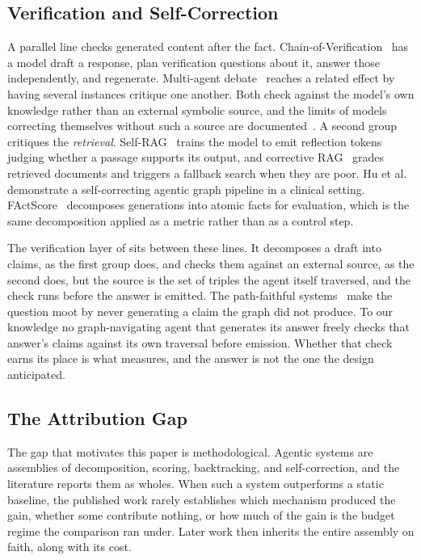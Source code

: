 \subsection{Verification and Self-Correction}\label{sec:rel-verify}

A parallel line checks generated content after the fact.
Chain-of-Verification~\cite{dhuliawala2024chain} has a model draft a
response, plan verification questions about it, answer those
independently, and regenerate. Multi-agent debate~\cite{du2024improving}
reaches a related effect by having several instances critique one
another. Both check against the model's own knowledge rather than an
external symbolic source, and the limits of models correcting themselves
without such a source are documented~\cite{huang2024selfcorrect}. A
second group critiques the \emph{retrieval}.
Self-RAG~\cite{asai2024selfrag} trains the model to emit reflection
tokens judging whether a passage supports its output, and corrective
RAG~\cite{yan2024crag} grades retrieved documents and triggers a
fallback search when they are poor. Hu et
al.~\cite{hu2025selfcorrecting} demonstrate a self-correcting agentic
graph pipeline in a clinical setting. FActScore~\cite{min2023factscore}
decomposes generations into atomic facts for evaluation, which is the
same decomposition applied as a metric rather than as a control step.

The verification layer of  sits between these
lines. It decomposes a draft into claims, as the first group does, and
checks them against an external source, as the second does, but the
source is the set of triples the agent itself traversed, and the check
runs before the answer is emitted. The path-faithful
systems~\cite{luo2024reasoning,luo2025gcr} make the question moot by
never generating a claim the graph did not produce. To our knowledge no
graph-navigating agent that generates its answer freely checks that
answer's claims against its own traversal before emission. Whether that
check earns its place is what  measures, and the
answer is not the one the design anticipated.

\subsection{The Attribution Gap}\label{sec:rel-attribution}

The gap that motivates this paper is methodological. Agentic systems are
assemblies of decomposition, scoring, backtracking, and self-correction,
and the literature reports them as wholes. When such a system
outperforms a static baseline, the published work rarely establishes
which mechanism produced the gain, whether some contribute nothing, or
how much of the gain is the budget regime the comparison ran under.
Later work then inherits the entire assembly on faith, along with its
cost.

